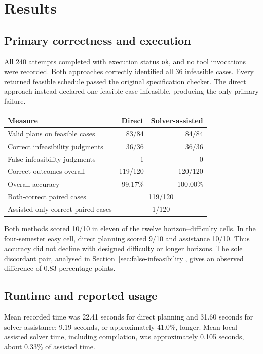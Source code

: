 \documentclass[11pt,a4paper]{article}
\newcommand{\code}[1]{\texttt{#1}}
\begin{document}
\par
\section{Results}
\subsection{Primary correctness and execution}
All 240 attempts completed with execution status \code{ok}, and no tool
invocations were recorded. Both approaches correctly identified all 36
infeasible cases. Every returned feasible schedule passed the original
specification checker. The direct approach instead declared one feasible
case infeasible, producing the only primary failure.

\begin{center}
\begin{minipage}{\linewidth}
\centering
{}
\label{tab:outcomes}
\begin{tabular}{@{}lrr@{}}
\toprule
Measure & Direct & Solver-assisted\\
\midrule
Valid plans on feasible cases & 83/84 & 84/84\\
Correct infeasibility judgments & 36/36 & 36/36\\
False infeasibility judgments & 1 & 0\\
Correct outcomes overall & 119/120 & 120/120\\
Overall accuracy & 99.17\% & 100.00\%\\
Both-correct paired cases & \multicolumn{2}{c}{119/120}\\
Assisted-only correct paired cases & \multicolumn{2}{c}{1/120}\\
\bottomrule
\end{tabular}
\end{minipage}
\end{center}

Both methods scored 10/10 in eleven of the twelve horizon--difficulty
cells. In the four-semester easy cell, direct planning scored 9/10 and
assistance 10/10. Thus accuracy did not decline with designed difficulty or
longer horizons. The sole discordant pair, analysed in
Section~\ref{sec:false-infeasibility}, gives an observed difference of
0.83 percentage points.

\subsection{Runtime and reported usage}
Mean recorded time was 22.41 seconds for direct planning and 31.60 seconds
for solver assistance: 9.19 seconds, or approximately 41.0\%, longer.
Mean local assisted solver time, including compilation, was approximately
0.105 seconds, about 0.33\% of assisted time.
\end{document}

